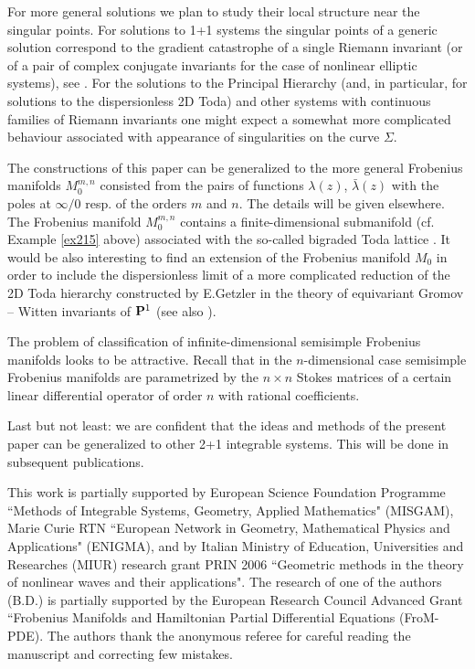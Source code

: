 \documentclass[numbook, envcountsame, envcountreset]{svjour3}
\begin{document}
For more general solutions we plan to study their local structure near the singular points. For solutions to 1+1 systems the singular points of a generic solution correspond to the gradient catastrophe of a single Riemann invariant (or of a pair of complex conjugate invariants for the case of nonlinear elliptic systems), see \cite{ams}. For the solutions to the Principal Hierarchy (and, in particular, for solutions to the dispersionless 2D Toda) and other systems with continuous families of Riemann invariants one might expect a somewhat more complicated behaviour associated with appearance of singularities on the curve $\Sigma$.

The constructions of this paper can be generalized to the more general Frobenius manifolds
$M_0^{m,n}$ consisted from the pairs of functions $\lambda(z)$, $\bar\lambda(z)$ with the poles at $\infty/0$ resp. of the orders $m$ and $n$. The details will be given elsewhere. The Frobenius manifold $M_0^{m,n}$ contains a finite-dimensional submanifold (cf. Example \ref{ex215} above) associated with the so-called bigraded Toda lattice \cite{ca2}. It would be also interesting to find an extension of the Frobenius manifold $M_0$ in order to include the dispersionless limit of a more complicated reduction of the 2D Toda hierarchy constructed by E.Getzler \cite{ge} in the theory of equivariant Gromov -- Witten invariants of ${\bf P}^1$ (see also \cite{fs,mt}).

The problem of classification of infinite-dimensional semisimple Frobenius manifolds looks to be attractive. Recall \cite{D92,icm} that in  the $n$-dimensional case semisimple Frobenius manifolds are parametrized by the $n\times n$ Stokes matrices of a certain linear differential operator of order $n$ with rational coefficients.

Last but not least: we are confident that the ideas and methods of the present paper can be generalized to other 2+1 integrable systems. This will be done in subsequent publications.

\begin{acknowledgements}
 This work is
partially supported by European Science Foundation Programme ``Methods of
Integrable Systems, Geometry, Applied Mathematics" (MISGAM), Marie Curie RTN ``European Network in Geometry, Mathematical Physics and Applications"  (ENIGMA), 
and by Italian Ministry of Education, Universities and Researches (MIUR) research grant PRIN 2006
``Geometric methods in the theory of nonlinear waves and their applications". The research of one of the authors (B.D.) is partially supported by the European Research Council Advanced Grant  ``Frobenius Manifolds and Hamiltonian Partial Differential Equations (FroM-PDE). The authors thank the anonymous referee for careful reading the manuscript and correcting few mistakes.
\end{acknowledgements}
\end{document}
